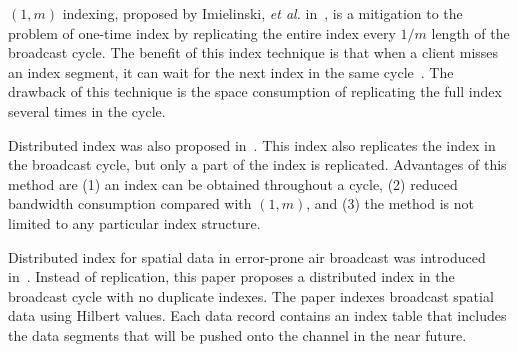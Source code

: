 $(1, m)$ indexing, proposed by Imielinski, \emph{et al.} in~\cite{journals/tkde/ImielinskiVB97}, is a mitigation to the problem of one-time index by replicating the entire index every $1/m$ length of the broadcast cycle. The benefit of this index technique is that when a client misses an index segment, it can wait for the next index in the same cycle~\cite{journals/tmc/KuZW08}. The drawback of this technique is the space consumption of replicating the full index several times in the cycle.

Distributed index was also proposed in~\cite{journals/tkde/ImielinskiVB97}. This index also replicates the index in the broadcast cycle, but only a part of the index is replicated. Advantages of this method are (1) an index can be obtained throughout a cycle, (2) reduced bandwidth consumption compared with $(1, m)$, and (3) the method is not limited to any particular index structure.



Distributed index for spatial data in error-prone air broadcast was introduced in~\cite{journals/vldb/ZhengLLLS09}. Instead of replication, this paper proposes a distributed index in the broadcast cycle with no duplicate indexes. The paper indexes broadcast spatial data using Hilbert values. Each data record contains an index table that includes the data segments that will be pushed onto the channel in the near future. %


